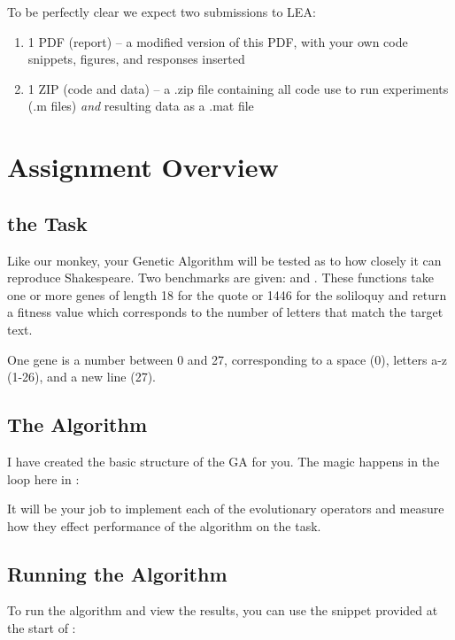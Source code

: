 \documentclass{article}
\begin{document}
To be perfectly clear we expect two submissions to LEA:
\begin{enumerate}
	\item 1 PDF (report) -- a modified version of this PDF, with your own code snippets, figures, and responses inserted
	\item 1 ZIP (code and data)   -- a .zip file containing all code use to run experiments (.m files) \textit{and} resulting data as a .mat file
\end{enumerate}

\newpage

\section{Assignment Overview}
\subsection*{the Task}
Like our monkey, your Genetic Algorithm will be tested as to how closely it can reproduce Shakespeare. Two benchmarks are given:  and . These functions take one or more genes of length 18 for the quote or 1446 for the soliloquy and return a fitness value which corresponds to the number of letters that match the target text.

One gene is a number between 0 and 27, corresponding to a space (0), letters a-z (1-26), and a new line (27).

\subsection*{The Algorithm}
I have created the basic structure of the GA for you. The magic happens in the loop here in :



It will be your job to implement each of the evolutionary operators and measure how they effect performance of the algorithm on the  task. 

\subsection*{Running the Algorithm}
	To run the algorithm and view the results, you can use the snippet provided at the start of :


\end{document}
